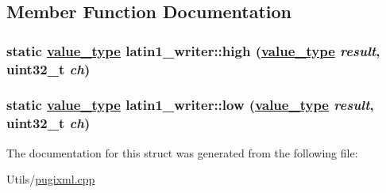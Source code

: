 \subsection{Member Function Documentation}
\hypertarget{structlatin1__writer_0e48c306ebe556f267404a9624f00554}{
\subsubsection[high]{\setlength{\rightskip}{0pt plus 5cm}static \hyperlink{structlatin1__writer_f9228600fa7eecd793cc3d927d46eb1a}{value\_\-type} latin1\_\-writer::high (\hyperlink{structlatin1__writer_f9228600fa7eecd793cc3d927d46eb1a}{value\_\-type} {\em result}, uint32\_\-t {\em ch})}}
\label{structlatin1__writer_0e48c306ebe556f267404a9624f00554}


\hypertarget{structlatin1__writer_b5d7a833d29d66031420686ca67b1f6e}{
\subsubsection[low]{\setlength{\rightskip}{0pt plus 5cm}static \hyperlink{structlatin1__writer_f9228600fa7eecd793cc3d927d46eb1a}{value\_\-type} latin1\_\-writer::low (\hyperlink{structlatin1__writer_f9228600fa7eecd793cc3d927d46eb1a}{value\_\-type} {\em result}, uint32\_\-t {\em ch})}}
\label{structlatin1__writer_b5d7a833d29d66031420686ca67b1f6e}




The documentation for this struct was generated from the following file:\begin{CompactItemize}
\item 
Utils/\hyperlink{pugixml_8cpp}{pugixml.cpp}\end{CompactItemize}
